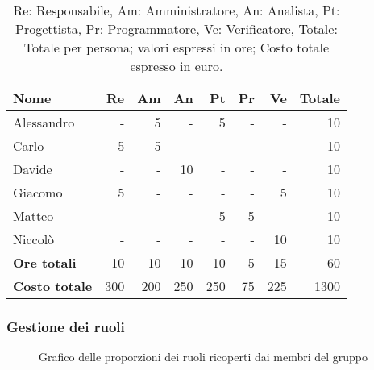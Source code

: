 \begin{table}[H]
	\centering
	\begin{tabular}{l|r|r|r|r|r|r|r}
		\textbf{Nome}         & \textbf{Re} & \textbf{Am} & \textbf{An} & \textbf{Pt} & \textbf{Pr} & \textbf{Ve} & \textbf{Totale} \\
		\hline
		Alessandro            & -           & 5           & -           & 5           & -           & -           & 10              \\
		Carlo                 & 5           & 5           & -           & -           & -           & -           & 10              \\
		Davide                & -           & -           & 10          & -           & -           & -           & 10              \\
		Giacomo               & 5           & -           & -           & -           & -           & 5           & 10              \\
		Matteo                & -           & -           & -           & 5           & 5           & -           & 10              \\
		Niccolò               & -           & -           & -           & -           & -           & 10          & 10              \\
		\hline
		\textbf{Ore totali}   & 10          & 10          & 10          & 10          & 5           & 15          & 60              \\
		\textbf{Costo totale} & 300         & 200         & 250         & 250         & 75          & 225         & 1300
	\end{tabular}
	\caption{Re: Responsabile, Am: Amministratore, An: Analista, Pt: Progettista,
		Pr: Programmatore, Ve: Verificatore, Totale: Totale per persona; valori espressi in ore; Costo totale espresso in euro.}
\end{table}

\newpage
\subsubsection{Gestione dei ruoli}

\begin{figure}[h]
	\centering
	\caption{Grafico delle proporzioni dei ruoli ricoperti dai membri del gruppo}
\end{figure}

